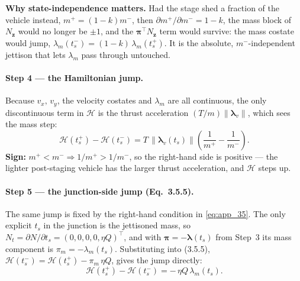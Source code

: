 \documentclass[../main.tex]{subfiles}
\begin{document}
\textbf{Why state-independence matters.} Had the stage shed a fraction of the vehicle instead, $m^+ = (1-k)m^-$, then $\partial m^+/\partial m^- = 1-k$, the mass block of $N_{\mathbf{z}}$ would no longer be $\pm 1$, and the $\boldsymbol{\pi}^{\!\top} N_{\mathbf{z}}$ term would survive: the mass costate would jump, $\lambda_m(t_s^-) = (1-k)\,\lambda_m(t_s^+)$. It is the absolute, $m^-$-independent jettison that lets $\lambda_m$ pass through untouched.

\paragraph{Step 4 --- the Hamiltonian jump.}
Because $v_x,\,v_y$, the velocity costates and $\lambda_m$ are all continuous, the only discontinuous term in $\mathcal{H}$ is the thrust acceleration $(T/m)\|\boldsymbol{\lambda}_v\|$, which sees the mass step:
\begin{equation}
  \mathcal{H}(t_s^+) - \mathcal{H}(t_s^-) = T\,\|\boldsymbol{\lambda}_v(t_s)\|\left(\frac{1}{m^+} - \frac{1}{m^-}\right).
  \label{eq:app_jump}
\end{equation}
\textbf{Sign:} $m^+ < m^- \Rightarrow 1/m^+ > 1/m^-$, so the right-hand side is positive --- the lighter post-staging vehicle has the larger thrust acceleration, and $\mathcal{H}$ steps up.

\paragraph{Step 5 --- the junction-side jump (Eq.~3.5.5).}
The same jump is fixed by the right-hand condition in \eqref{eq:app_35}. The only explicit $t_s$ in the junction is the jettisoned mass, so $N_t = \partial N/\partial t_s = (0,0,0,0,\eta Q)^{\!\top}$, and with $\boldsymbol{\pi} = -\boldsymbol{\lambda}(t_s)$ from Step~3 its mass component is $\pi_m = -\lambda_m(t_s)$. Substituting into (3.5.5), $\mathcal{H}(t_s^-) = \mathcal{H}(t_s^+) - \pi_m\,\eta Q$, gives the jump directly:
\begin{equation}
  \mathcal{H}(t_s^+) - \mathcal{H}(t_s^-) = -\,\eta Q\,\lambda_m(t_s).
  \label{eq:app_we_raw}
\end{equation}
\end{document}
